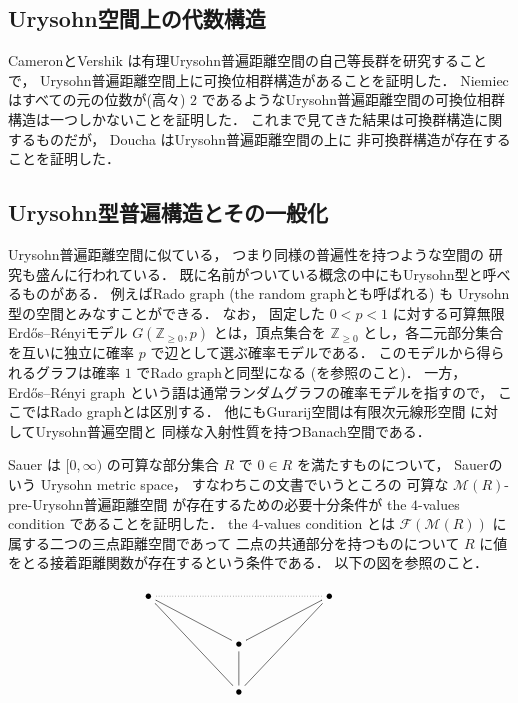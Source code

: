 \documentclass[leqno, 12pt]{jsarticle}
\newcommand{\zz}{\mathbb{Z}}
\newcommand{\yozz}[1]{\zz_{\ge #1}}
\newcommand{\Met}[1]{\mathscr{M}(#1)}
\newcommand{\FinitePart}[1]{\mathscr{F}(#1)}
\newcommand{\FinMet}[1]{\FinitePart{\Met{#1}}}
\begin{document}
\subsection{Urysohn空間上の代数構造}\label{subsec:research:algebraic-structures}
 CameronとVershik
 \cite{CV}
 は有理Urysohn普遍距離空間の自己等長群を研究することで，
 Urysohn普遍距離空間上に可換位相群構造があることを証明した．
 Niemiec
 \cite{Niefun}
 はすべての元の位数が(高々)
 $2$
 であるようなUrysohn普遍距離空間の可換位相群構造は一つしかないことを証明した．
 これまで見てきた結果は可換群構造に関するものだが，%
Doucha
 \cite{Doucha}
 はUrysohn普遍距離空間の上に
 非可換群構造が存在することを証明した．


\subsection{Urysohn型普遍構造とその一般化}\label{subsec:research:generalizations}
Urysohn普遍距離空間に似ている，
つまり同様の普遍性を持つような空間の
研究も盛んに行われている．
既に名前がついている概念の中にもUrysohn型と呼べるものがある．
例えばRado graph
(the random graphとも呼ばれる)
も
Urysohn型の空間とみなすことができる．
なお，
固定した
$0<p<1$
に対する可算無限Erd\H{o}s--R\'{e}nyiモデル
$G(\yozz{0},p)$
とは，頂点集合を
$\yozz{0}$
とし，各二元部分集合を互いに独立に確率
$p$
で辺として選ぶ確率モデルである．
このモデルから得られるグラフは確率
$1$
でRado graphと同型になる
(\cite{CameronRandomGraph}を参照のこと)．
一方，
Erd\H{o}s--R\'{e}nyi graph
という語は通常ランダムグラフの確率モデルを指すので，
ここではRado graphとは区別する．
他にもGurarij空間は有限次元線形空間
に対してUrysohn普遍空間と
同様な入射性質を持つBanach空間である．


Sauer \cite{Sau}
は
$[0, \infty)$
 の可算な部分集合
 $R$
 で
 $0\in R$
 を満たすものについて，
Sauerのいう
Urysohn metric space，
すなわちこの文書でいうところの
可算な
$\Met{R}$-pre-Urysohn普遍距離空間
が存在するための必要十分条件が
the
$4$-values condition
 であることを証明した．
the
$4$-values condition
とは
$\FinMet{R}$
に属する二つの三点距離空間であって
二点の共通部分を持つものについて
$R$
に値をとる接着距離関数が存在するという条件である．%
以下の図を参照のこと．


  \[
   \xymatrix{
\bullet \ar@{.}[rrrr]\ar@{-}[rrdd] \ar@{-}[rrd] &  &  & & \bullet\ar@{-}[lldd]\ar@{-}[lld] \\
 &  & \bullet\ar@{-}[d]&  &  &\\
 &  & \bullet  &  &
 }
\]
\end{document}
